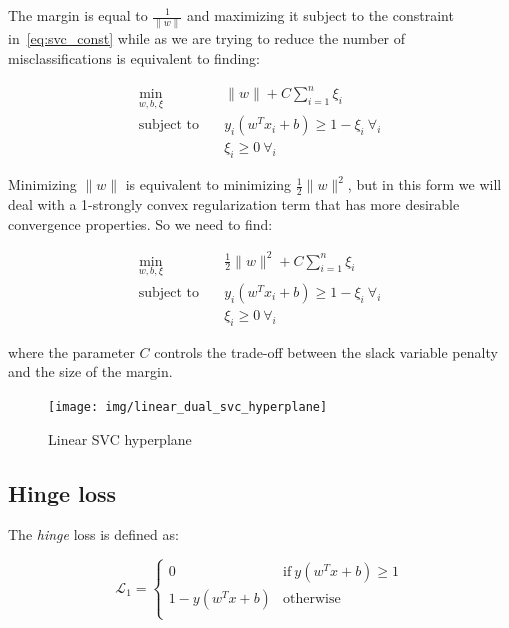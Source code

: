 The margin is equal to $\displaystyle \frac{1}{\| w \|}$ and maximizing it subject to the constraint in~\eqref{eq:svc_const} while as we are trying to reduce the number of misclassifications is equivalent to finding:

\begin{equation} \label{eq:svc_obj}
    \begin{aligned}
        \min_{w,b,\xi} \quad & \| w \| + C \sum_{i=1}^n \xi_i \\
            \text{subject to} \quad & y_i (w^T x_i + b) \geq 1 - \xi_i \ \forall_i \\ & \xi_i \geq 0 \ \forall_i
    \end{aligned}
\end{equation}

Minimizing $\| w \|$ is equivalent to minimizing $\displaystyle \frac{1}{2} \| w \|^2$, but in this form we will deal with a 1-strongly convex regularization term that has more desirable convergence properties. So we need to find:

\begin{equation} \label{eq:quad_svc_obj}
    \begin{aligned}
        \min_{w,b,\xi} \quad & \frac{1}{2} \| w \|^2 + C \sum_{i=1}^n \xi_i \\
            \text{subject to} \quad & y_i (w^T x_i + b) \geq 1 - \xi_i \ \forall_i \\ & \xi_i \geq 0 \ \forall_i
    \end{aligned}
\end{equation}

where the parameter $C$ controls the trade-off between the slack variable penalty and the size of the margin.

\begin{figure}[h!]
	\centering
	\texttt{[image: img/linear\_dual\_svc\_hyperplane]}
	\caption{Linear SVC hyperplane}
	\label{fig:linear_dual_svc_hyperplane}
\end{figure}

\pagebreak

\subsection{Hinge loss}

The \emph{hinge} loss is defined as:

\begin{equation} \label{eq:hinge_loss1}
	\mathcal{L}_1 = 
	\begin{cases}
		0 & \text{if} \ y (w^T x + b) \geq 1 \\
		1 - y (w^T x + b) & \text{otherwise} \\
	\end{cases}
\end{equation}

